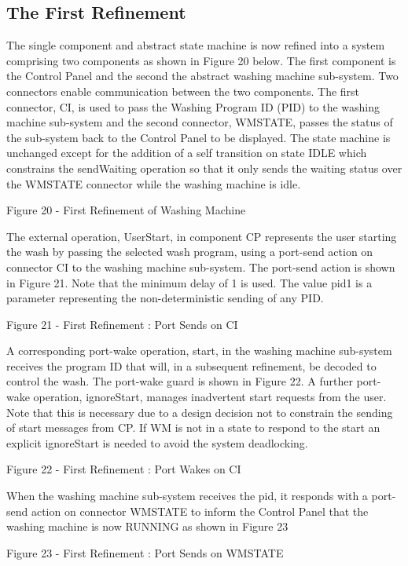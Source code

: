 \subsection{The First Refinement}
\label{sec:component_diagrams-tutorial_firstRefinement}


The single component and abstract state machine is now refined into a system comprising two components as shown in Figure 20 below. The first component is the Control Panel and the second the abstract washing machine sub-system. Two connectors enable communication between the two components. The first connector, CI, is used to pass the Washing Program ID (PID) to the washing machine sub-system and the second connector, WMSTATE, passes the status of the sub-system back to the Control Panel to be displayed. The state machine is unchanged except for the addition of a self transition on state IDLE which constrains the sendWaiting operation so that it only sends the waiting status over the WMSTATE connector while the washing machine is idle.
 
Figure 20 - First Refinement of Washing Machine

The external operation, UserStart, in component CP represents the user starting the wash by passing the selected wash program, using a port-send action on connector CI to the washing machine sub-system. The port-send action is shown in Figure 21. Note that the minimum delay of 1 is used. The value pid1 is a parameter representing the non-deterministic sending of any PID.
 
Figure 21 - First Refinement : Port Sends on CI

A corresponding port-wake operation, start, in the washing machine sub-system receives the program ID that will, in a subsequent refinement, be decoded to control the wash. The port-wake guard is shown in Figure 22. 
A further port-wake operation, ignoreStart, manages inadvertent start requests from the user. Note that this is necessary due to a design decision not to constrain the sending of start messages from CP. If WM is not in a state to respond to the start an explicit ignoreStart is needed to avoid the system deadlocking.
 
Figure 22 - First Refinement : Port Wakes on CI

When the washing machine sub-system receives the pid, it responds with a port-send action on connector WMSTATE to inform the Control Panel that the washing machine is now RUNNING as shown in Figure 23
 
Figure 23 - First Refinement : Port Sends on WMSTATE

